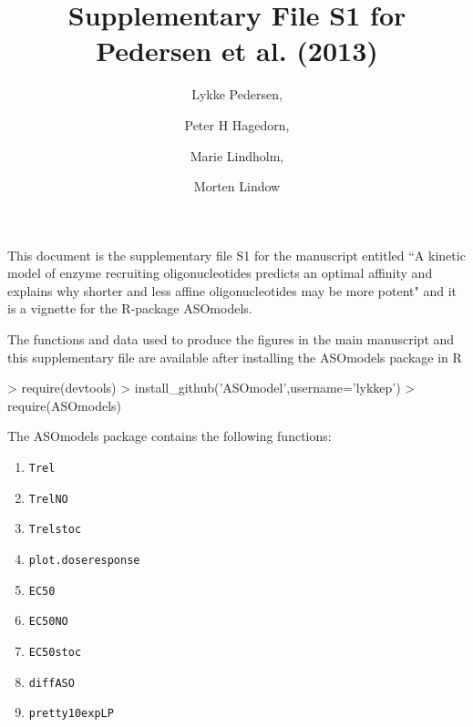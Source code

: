 \documentclass[a4paper,11pt]{article}
\title{Supplementary File S1 for Pedersen et al. (2013)}
\author{Lykke Pedersen, \and Peter H Hagedorn, \and Marie Lindholm, \and Morten Lindow}
\date{}
\begin{document}

\maketitle

This document is the supplementary file S1 for the manuscript entitled ``A kinetic model of enzyme recruiting oligonucleotides predicts an optimal affinity and explains why shorter and less affine oligonucleotides may be more potent" and it is a vignette for the R-package ASOmodels.

The functions and data used to produce the figures in the main manuscript and this supplementary file are available after installing the ASOmodels package in R
\begin{Schunk}
\begin{Sinput}
> require(devtools)
> install_github('ASOmodel',username='lykkep')
> require(ASOmodels)
\end{Sinput}
\end{Schunk}
The ASOmodels package contains the following functions:
\begin{enumerate}
\item \texttt{Trel}
\item \texttt{TrelNO}
\item \texttt{Trelstoc}
\item \texttt{plot.doseresponse}
\item \texttt{EC50}
\item \texttt{EC50NO}
\item \texttt{EC50stoc}
\item \texttt{diffASO}
\item \texttt{pretty10expLP}
\end{enumerate}

\newpage

\tableofcontents

\newpage


\end{document}
